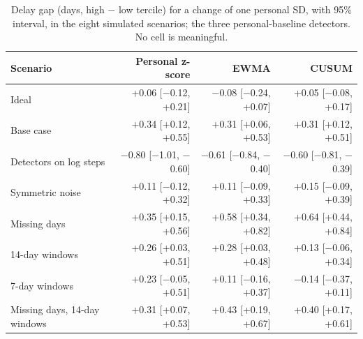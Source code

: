 \begin{table}[!htbp]
\centering
\footnotesize
\setlength{\tabcolsep}{3.0pt}
\caption{Delay gap (days, high $-$ low tercile) for a change of one personal SD, with 95\% interval, in the eight simulated scenarios; the three personal-baseline detectors. No cell is meaningful.}
\label{tab:scenarios_ci_delay}
\begin{tabular}{@{}p{3.6cm}rrr@{}}
\toprule
Scenario & Personal z-score & EWMA & CUSUM \\
\midrule
Ideal & +0.06 [$-$0.12, +0.21] & $-$0.08 [$-$0.24, +0.07] & +0.05 [$-$0.08, +0.17] \\
Base case & +0.34 [+0.12, +0.55] & +0.31 [+0.06, +0.53] & +0.31 [+0.12, +0.51] \\
Detectors on log steps & $-$0.80 [$-$1.01, $-$0.60] & $-$0.61 [$-$0.84, $-$0.40] & $-$0.60 [$-$0.81, $-$0.39] \\
Symmetric noise & +0.11 [$-$0.12, +0.32] & +0.11 [$-$0.09, +0.33] & +0.15 [$-$0.09, +0.39] \\
Missing days & +0.35 [+0.15, +0.56] & +0.58 [+0.34, +0.82] & +0.64 [+0.44, +0.84] \\
14-day windows & +0.26 [+0.03, +0.51] & +0.28 [+0.03, +0.48] & +0.13 [$-$0.06, +0.34] \\
7-day windows & +0.23 [$-$0.05, +0.51] & +0.11 [$-$0.16, +0.37] & $-$0.14 [$-$0.37, +0.11] \\
Missing days, 14-day windows & +0.31 [+0.07, +0.53] & +0.43 [+0.19, +0.67] & +0.40 [+0.17, +0.61] \\
\bottomrule
\end{tabular}
\end{table}
